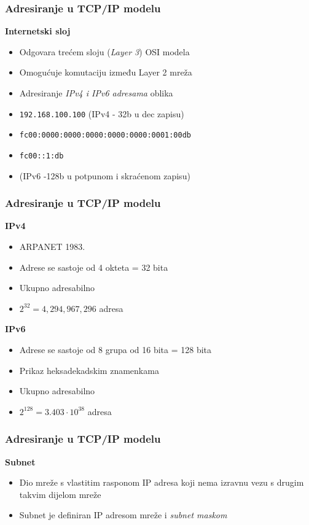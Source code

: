 \documentclass[t,table,usenames,dvipsnames]{beamer}
\begin{document}
\begin{frame}
	\frametitle{Adresiranje u TCP/IP modelu}
	\textbf{Internetski sloj}
	\begin{itemize}
		\item Odgovara trećem sloju (\textit{Layer 3}) OSI modela
		\item Omogućuje komutaciju između Layer 2 mreža
		\item Adresiranje \emph{IPv4 i IPv6 adresama} oblika
		\item[] \texttt{192.168.100.100} \hfill (IPv4 - 32b u dec zapisu)
		\item[] \texttt{fc00:0000:0000:0000:0000:0000:0001:00db}
		\item[] \texttt{fc00::1:db}
		\item[] \hfill (IPv6 -128b u potpunom i skraćenom zapisu)
	\end{itemize}
\end{frame}

\begin{frame}
	\frametitle{Adresiranje u TCP/IP modelu}
	\textbf{IPv4}
	\begin{itemize}
		\item ARPANET 1983.
		\item Adrese se sastoje od 4 okteta = 32 bita
		\item Ukupno adresabilno
		\item[] $2^{32} = 4,294,967,296$ adresa
	\end{itemize}
	\vfill
	\textbf{IPv6}
	\begin{itemize}
		\item Adrese se sastoje od 8 grupa od 16 bita = 128 bita
		\item Prikaz heksadekadskim znamenkama
		\item Ukupno adresabilno
		\item[] $2^{128} = 3.403 \cdot 10^{38}$ adresa
	\end{itemize}
\end{frame}


\begin{frame}
	\frametitle{Adresiranje u TCP/IP modelu}
	\textbf{Subnet}
	\begin{itemize}
		\item Dio mreže s vlastitim rasponom IP adresa koji nema izravnu vezu s drugim takvim dijelom mreže
		\item Subnet je definiran IP adresom mreže i \textit{subnet maskom}
	\end{itemize}
\end{frame}
\end{document}
